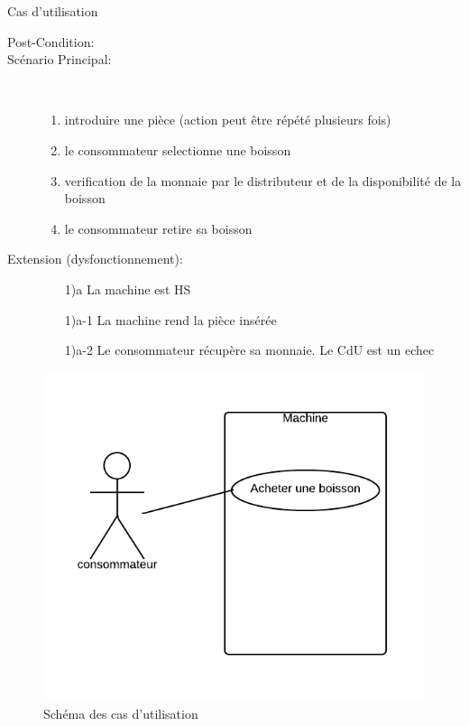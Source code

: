 \begin{LQ}{Cas d'utilisation}
\begin{description}
\item[Post-Condition:]
\item[Scénario Principal:]\\
		\begin{enumerate}
			\item introduire une pièce (action peut être répété plusieurs fois)
			\item le consommateur selectionne une boisson
	    \item verification de la monnaie par le distributeur et de la disponibilité de la boisson
	   \item le consommateur retire sa boisson

			\end{enumerate}
		
\item[Extension (dysfonctionnement):] 
		\begin{itemize}
			\item[1)a] La machine est HS
			\item[1)a-1] La machine rend la pièce insérée
			\item[1)a-2] Le consommateur récupère sa monnaie. Le CdU est un echec
		\end{itemize}

\end{description}



\begin{figure}[H]
   \centering
   \includegraphics[width=\textwidth]{images/CdU.png}
   \caption{Schéma des cas d'utilisation}
\end{figure}


\end{LQ}
